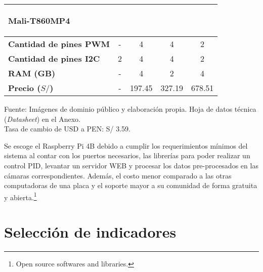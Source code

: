 \begin{savenotes}
\begin{mytable}[H]
\begin{tabular}{l|c|c|c|c|}
\begin{minipage}{\mythirdmaxsizeofcontenttable}
\begin{myflushcenterinsidetable}
					Mali-T860MP4
			\end{myflushcenterinsidetable}\end{minipage} \\ \hline		
			\multicolumn{1}{|l|}{
				\begin{minipage}{\myforthmaxsizeofcontenttable}	
					\textbf{Cantidad de pines PWM}
				\end{minipage}
			} & - & 4 & 4 & 2 \\ \hline		
			\multicolumn{1}{|l|}{
				\begin{minipage}{\myforthmaxsizeofcontenttable}	
					\textbf{Cantidad de pines I2C}
				\end{minipage}
			} & 2 & 4 & 4 & 2 \\ \hline		
			\multicolumn{1}{|l|}{
				\begin{minipage}{\myforthmaxsizeofcontenttable}	
					\textbf{RAM (GB)}
				\end{minipage}
			} & - & 4 & 2 & 4 \\ \hline
			\multicolumn{1}{|l|}{
				\begin{minipage}{\myforthmaxsizeofcontenttable}	
					\textbf{Precio ($S/$)}
				\end{minipage}
			} & - & 197.45 & 327.19 & 678.51 \\ \hline		
		\end{tabular}
		\begin{myflushcenteraftertable}	
			Fuente: Imágenes de dominio público y elaboración propia. Hoja de datos técnica (\textit{Datasheet}) en el Anexo.\\
			Tasa de cambio de USD a PEN: S/ 3.59.
		\end{myflushcenteraftertable}
	\end{mytable}
\end{savenotes}

Se escoge el Raspberry Pi 4B debido a cumplir los requerimientos mínimos del sistema al contar con los puertos necesarios, las librerías para poder realizar un control PID, levantar un servidor WEB y procesar los datos pre-procesados en las cámaras correspondientes. Además, el costo menor comparado a las otras computadoras de una placa y el soporte mayor a su comunidad de forma gratuita y abierta.\footnote{Open source softwares and libraries.}

\section{Selección de indicadores}

